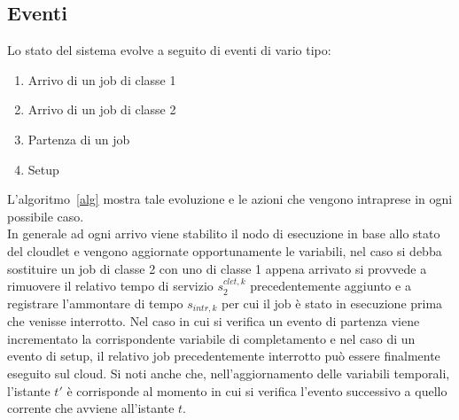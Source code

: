 \subsection{Eventi}
Lo stato del sistema evolve a seguito di eventi di vario tipo:
\begin{enumerate}
\item{Arrivo di un job di classe 1}
\item{Arrivo di un job di classe 2}
\item{Partenza di un job}
\item{Setup}
\end{enumerate}
%
L'algoritmo~\ref{alg} mostra tale evoluzione e le azioni che vengono intraprese
in ogni possibile caso.\\
In generale ad ogni arrivo viene stabilito il nodo di esecuzione in base allo
stato del cloudlet e vengono aggiornate opportunamente le variabili, nel caso si
debba sostituire un job di classe 2 con uno di classe 1 appena arrivato si
provvede a rimuovere il relativo tempo di servizio $s_2^{clet,k}$
precedentemente aggiunto e a registrare l'ammontare di tempo $s_{intr,k}$ per
cui il job è stato in esecuzione prima che venisse interrotto.  Nel caso in cui
si verifica un evento di partenza viene incrementato la corrispondente variabile
di completamento e nel caso di un evento di setup, il relativo job
precedentemente interrotto può essere finalmente eseguito sul cloud. Si noti
anche che, nell'aggiornamento delle variabili temporali, l'istante $t'$ è
corrisponde al momento in cui si verifica l'evento successivo a quello corrente
che avviene all'istante $t$.
%
